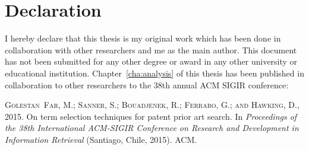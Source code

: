 \chapter*{Declaration}
\vspace{-1em}
I hereby declare that this thesis is my original work which has been done in 
collaboration with other researchers and me as the main author. This document has
not been submitted for any other degree or award in any other university or educational 
institution. Chapter~\ref{cha:analysis} of this thesis has been published in collaboration to other
researchers to the 38th annual ACM SIGIR conference:
\begin{itemize}
\textsc{Golestan~Far, M.; Sanner, S.; Bouadjenek, R.; Ferraro, G.; and Hawking,
  D.}, 2015.
\newblock On term selection techniques for patent prior art search.
\newblock In \emph{Proceedings of the 38th International ACM-SIGIR Conference
  on Research and Development in Information Retrieval} (Santiago, Chile,
  2015). ACM.
\end{itemize}


